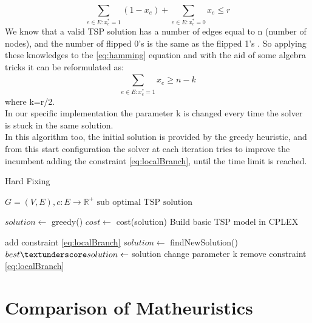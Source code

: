 \begin{equation}\label{eq:hamming}
    \sum_{e\in E: x_e^*=1}^{}(1-x_e) + \sum_{e\in E: x_e^*=0}^{}x_e \leq r
\end{equation}
We know that a valid TSP solution has a number of edges equal to n (number of nodes), and the number of flipped 0’s is the same as the flipped 1’s . So applying these knowledges to the \ref{eq:hamming} equation and with the aid of some algebra tricks it can be reformulated as:
\begin{equation}\label{eq:localBranch}
    \sum_{e\in E: x_e^*=1}^{}x_e \geq n-k
\end{equation}
where k=r/2.
\\
In our specific implementation the parameter k is changed every time the solver is stuck in the same solution. \\
In this algorithm too, the initial solution is provided by the greedy heuristic, and from this start configuration the solver at each iteration tries to improve the incumbent adding the constraint \ref{eq:localBranch}, until the time limit is reached.


\begin{algorithm}
    \caption{Hard Fixing}\label{algo:SoftFixing}
    \begin{algorithmic}[1]
    \Require $G = (V,E), c:E \to \mathbb{R}^+$
    \Ensure $\text{sub optimal TSP solution}$

    \State $solution \gets$ greedy()
    \State $cost \gets $ cost(solution)
    \State Build basic TSP model in CPLEX



    \State add constraint \ref{eq:localBranch}
    \State $solution \gets$ findNewSolution()
    \State $ best\textunderscore solution \gets$ solution
    \State change parameter k
    \EndIf
    \State remove constraint \ref{eq:localBranch}
    \EndWhile

    \end{algorithmic}
\end{algorithm}


\section{Comparison of Matheuristics}
